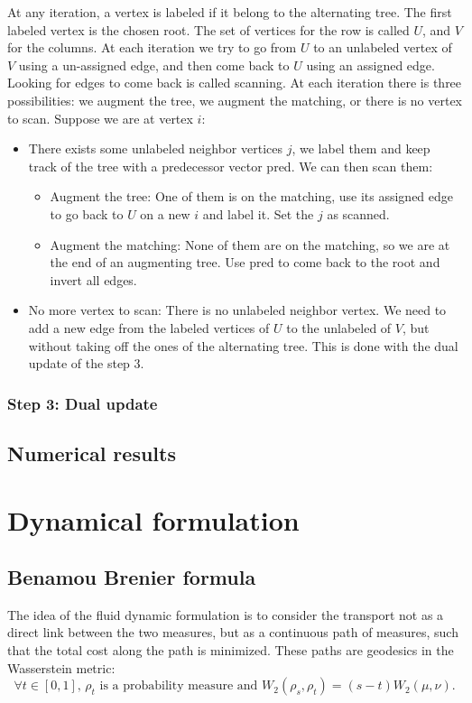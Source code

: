 \documentclass[a4paper]{article}
\theoremstyle{definition}
\theoremstyle{remark}
\begin{document}
At any iteration, a vertex is labeled if it belong to the alternating tree. The first labeled vertex is the chosen root. The set of vertices for the row is called $U$, and $V$ for the columns. At each iteration we try to go from $U$ to an unlabeled vertex of $V$ using a un-assigned edge, and then come back to $U$ using an assigned edge. Looking for edges to come back is called scanning. At each iteration there is three possibilities: we augment the tree, we augment the matching, or there is no vertex to scan. Suppose we are at vertex $i$:
\begin{itemize}
    \item There exists some unlabeled neighbor vertices $j$, we label them and keep track of the tree with a predecessor vector pred. We can then scan them:
    \begin{itemize}
        \item Augment the tree: One of them is on the matching, use its assigned edge to go back to $U$ on a new $i$ and label it. Set the $j$ as scanned.
        \item Augment the matching: None of them are on the matching, so we are at the end of an augmenting tree. Use pred to come back to the root and invert all edges.
    \end{itemize}
    \item No more vertex to scan: There is no unlabeled neighbor vertex. We need to add a new edge from the labeled vertices of $U$ to the unlabeled of $V$, but without taking off the ones of the alternating tree. This is done with the dual update of the step 3.
\end{itemize}

\subsubsection*{Step 3: Dual update}
\subsection{Numerical results}
\section{Dynamical formulation}
\subsection{Benamou Brenier formula}
The idea of the fluid dynamic formulation is to consider the transport not as a direct link between the two measures, but as a continuous path of measures, such that the total cost along the path is minimized. These paths are geodesics in the Wasserstein metric:
$$\forall t\in[0,1],\, \rho_t \text{ is a probability measure and } W_2(\rho_s,\rho_t) = (s-t)W_2(\mu,\nu).$$
\end{document}

